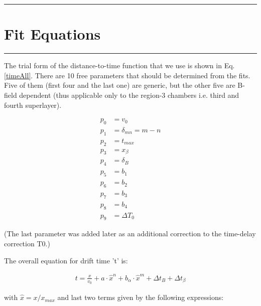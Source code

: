 \documentclass[12pt]{article}
\begin{document}

{\color{black} \rule{\linewidth}{0.75mm} }
\section{Fit Equations}
\label{sFitEquations}
{\color{black} \rule{\linewidth}{0.75mm} }

The trial form of the distance-to-time function that we use is shown in Eq. \ref{timeAll}. 
There are 10 free parameters that should be determined from the fits. Five of them (first four and the last one) are generic, but the other five are B-field dependent (thus applicable only to the region-3 chambers i.e. third and fourth superlayer).

\begin{equation}
\label{freePars}
\begin{aligned}
  p_0 & = v_0 \\
  p_1 & = \delta_{mn} = m - n  \\ %
  p_2 & = t_{max}   \\
  p_3 & = x_{\beta} \\ 
  p_4 & = \delta_{B} \\
  p_5 & = b_1  \\
  p_6 & = b_2  \\
  p_7 & = b_3  \\
  p_8 & = b_4 \\
  p_9 & = \Delta T_0
\end{aligned}
\end{equation}

(The last parameter was added later as an additional correction to the time-delay correction T0.)

The overall equation for drift time 't' is:

\begin{equation}
\label{timeAll}
\begin{aligned}
     t = \frac{x}{v_0} + a \cdot \hat{x}^n + b_{\alpha}\cdot \hat{x}^m + \Delta t_{B} + \Delta t_{\beta}
\end{aligned}
\end{equation}

with $\hat{x} = x / x_{max}$ and last two terms given by the following expressions:
\end{document}
